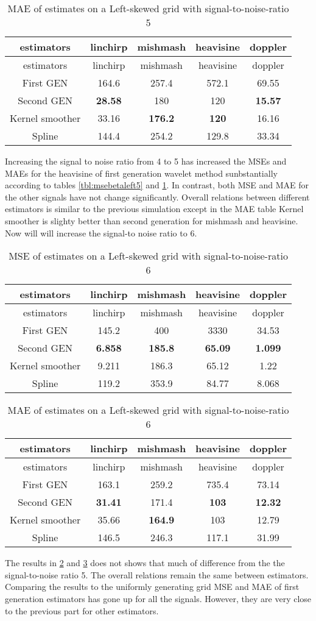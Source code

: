 \documentclass[12pt,twoside, a4paper]{reedthesis}
\begin{document}
\begin{longtable}[]{@{}ccccc@{}}
\caption{\label{tbl:maebetaleft5}MAE of estimates on a Left-skewed grid with signal-to-noise-ratio 5}\tabularnewline
\toprule
estimators & linchirp & mishmash & heavisine & doppler\tabularnewline
\midrule
\endfirsthead
\toprule
estimators & linchirp & mishmash & heavisine & doppler\tabularnewline
\midrule
\endhead
First GEN & 164.6 & 257.4 & 572.1 & 69.55\tabularnewline
Second GEN & \textbf{28.58} & 180 & 120 & \textbf{15.57}\tabularnewline
Kernel smoother & 33.16 & \textbf{176.2} & \textbf{120} & 16.16\tabularnewline
Spline & 144.4 & 254.2 & 129.8 & 33.34\tabularnewline
\bottomrule
\end{longtable}
Increasing the signal to noise ratio from 4 to 5 has increased the MSEs and MAEs for the heavisine of first generation wavelet method sunbstantially according to tables \ref{tbl:msebetaleft5} and \ref{tbl:maebetaleft5}. In contrast, both MSE and MAE for the other signals have not change significantly. Overall relations between different estimators is similar to the previous simulation except in the MAE table Kernel smoother is slighty better than second generation for mishmash and heavisine. Now will will increase the signal-to noise ratio to 6.
\begin{longtable}[]{@{}ccccc@{}}
\caption{\label{tbl:msebetaleft6}MSE of estimates on a Left-skewed grid with signal-to-noise-ratio 6}\tabularnewline
\toprule
estimators & linchirp & mishmash & heavisine & doppler\tabularnewline
\midrule
\endfirsthead
\toprule
estimators & linchirp & mishmash & heavisine & doppler\tabularnewline
\midrule
\endhead
First GEN & 145.2 & 400 & 3330 & 34.53\tabularnewline
Second GEN & \textbf{6.858} & \textbf{185.8} & \textbf{65.09} & \textbf{1.099}\tabularnewline
Kernel smoother & 9.211 & 186.3 & 65.12 & 1.22\tabularnewline
Spline & 119.2 & 353.9 & 84.77 & 8.068\tabularnewline
\bottomrule
\end{longtable}
\begin{longtable}[]{@{}ccccc@{}}
\caption{\label{tbl:maebetaleft6}MAE of estimates on a Left-skewed grid with signal-to-noise-ratio 6}\tabularnewline
\toprule
estimators & linchirp & mishmash & heavisine & doppler\tabularnewline
\midrule
\endfirsthead
\toprule
estimators & linchirp & mishmash & heavisine & doppler\tabularnewline
\midrule
\endhead
First GEN & 163.1 & 259.2 & 735.4 & 73.14\tabularnewline
Second GEN & \textbf{31.41} & 171.4 & \textbf{103} & \textbf{12.32}\tabularnewline
Kernel smoother & 35.66 & \textbf{164.9} & 103 & 12.79\tabularnewline
Spline & 146.5 & 246.3 & 117.1 & 31.99\tabularnewline
\bottomrule
\end{longtable}
The results in \ref{tbl:msebetaleft6} and \ref{tbl:maebetaleft6} does not shows that much of difference from the the signal-to-noise ratio 5. The overall relations remain the same between estimators. Comparing the results to the uniformly generating grid MSE and MAE of first generation estimators has gone up for all the signals. However, they are very close to the previous part for other estimators.
\end{document}
